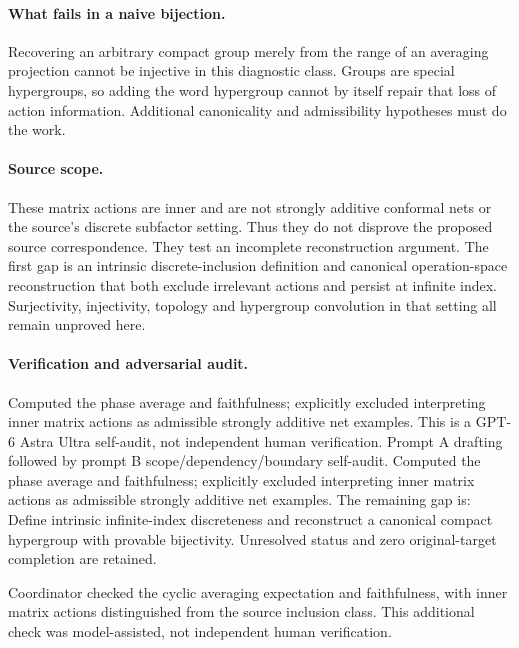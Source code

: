 \documentclass[11pt]{article}
\begin{document}
\paragraph{What fails in a naive bijection.} Recovering an arbitrary compact group merely from the range of an averaging projection cannot be injective in this diagnostic class. Groups are special hypergroups, so adding the word hypergroup cannot by itself repair that loss of action information. Additional canonicality and admissibility hypotheses must do the work.
\paragraph{Source scope.} These matrix actions are inner and are not strongly additive conformal nets or the source's discrete subfactor setting. Thus they do not disprove the proposed source correspondence. They test an incomplete reconstruction argument. The first gap is an intrinsic discrete-inclusion definition and canonical operation-space reconstruction that both exclude irrelevant actions and persist at infinite index. Surjectivity, injectivity, topology and hypergroup convolution in that setting all remain unproved here.

\paragraph{Verification and adversarial audit.}
Computed the phase average and faithfulness; explicitly excluded interpreting inner matrix actions as admissible strongly additive net examples. This is a GPT-6 Astra Ultra self-audit, not independent human verification. Prompt A drafting followed by prompt B scope/dependency/boundary self-audit. Computed the phase average and faithfulness; explicitly excluded interpreting inner matrix actions as admissible strongly additive net examples. The remaining gap is: Define intrinsic infinite-index discreteness and reconstruct a canonical compact hypergroup with provable bijectivity. Unresolved status and zero original-target completion are retained.

Coordinator checked the cyclic averaging expectation and faithfulness, with inner matrix actions distinguished from the source inclusion class. This additional check was model-assisted, not independent human verification.
\end{document}
